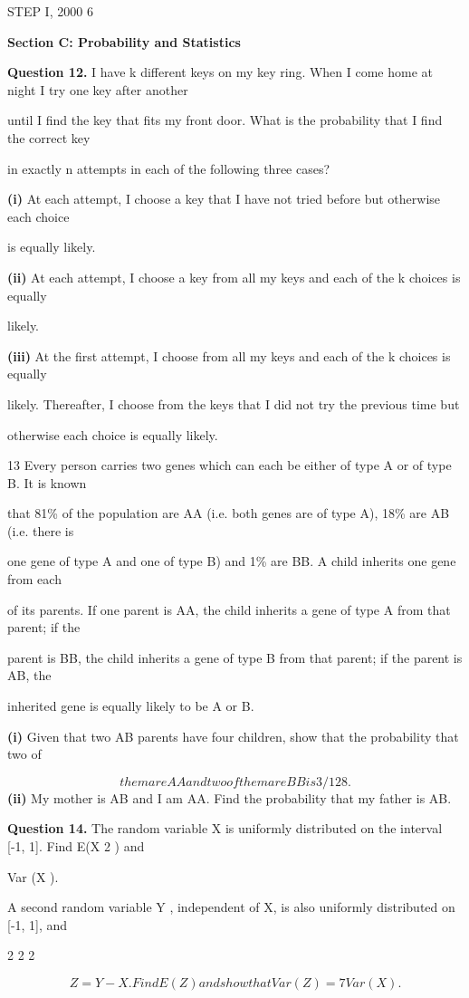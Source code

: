 \documentclass[12pt]{article}
\begin{document}
\begin{flushleft}
STEP I, 2000 6\par
\bigskip\textbf{Section C: Probability and Statistics}\par
\bigskip\textbf{Question 12.} I have k different keys on my key ring. When I come home at night I try one key after another\par
until I find the key that fits my front door. What is the probability that I find the correct key\par
in exactly n attempts in each of the following three cases?\par
\textbf{(i)} At each attempt, I choose a key that I have not tried before but otherwise each choice\par
is equally likely.\par
\textbf{(ii)} At each attempt, I choose a key from all my keys and each of the k choices is equally\par
likely.\par
\textbf{(iii)} At the first attempt, I choose from all my keys and each of the k choices is equally\par
likely. Thereafter, I choose from the keys that I did not try the previous time but\par
otherwise each choice is equally likely.\par
13 Every person carries two genes which can each be either of type A or of type B. It is known\par
that 81\% of the population are AA (i.e. both genes are of type A), 18\% are AB (i.e. there is\par
one gene of type A and one of type B) and 1\% are BB. A child inherits one gene from each\par
of its parents. If one parent is AA, the child inherits a gene of type A from that parent; if the\par
parent is BB, the child inherits a gene of type B from that parent; if the parent is AB, the\par
inherited gene is equally likely to be A or B.\par
\textbf{(i)} Given that two AB parents have four children, show that the probability that two of\par
\[them are AA and two of them are BB is 3/128.\]
\textbf{(ii)} My mother is AB and I am AA. Find the probability that my father is AB.\par
\bigskip\textbf{Question 14.} The random variable X is uniformly distributed on the interval [-1, 1]. Find E(X 2 ) and\par
Var (X ).\par
A second random variable Y , independent of X, is also uniformly distributed on [-1, 1], and\par
2 2 2\par
\[Z = Y - X. Find E(Z ) and show that Var (Z ) = 7 Var (X ).\]
\end{flushleft}
\end{document}
